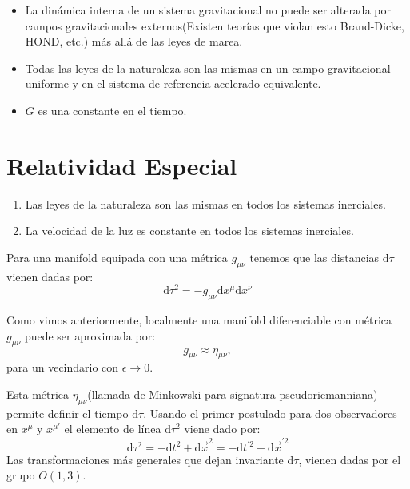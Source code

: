 \documentclass[../main]{subfiles}
\begin{document}
\begin{itemize}
    \item La dinámica interna de un sistema gravitacional no puede ser alterada por campos gravitacionales externos(Existen teorías que violan esto Brand-Dicke, HOND, etc.) más allá de las leyes de marea.
    \item Todas las leyes de la naturaleza son las mismas en un campo gravitacional uniforme y en el sistema de referencia acelerado equivalente.
    \item $G$ es una constante en el tiempo.
\end{itemize}

\section{Relatividad Especial}
\begin{enumerate}
    \item Las leyes de la naturaleza son las mismas en todos los sistemas inerciales.
    \item La velocidad de la luz es constante en todos los sistemas inerciales.
\end{enumerate}
Para una manifold equipada con una métrica $g_{\mu\nu}$ tenemos que las distancias $\mathrm{d}\tau$ vienen dadas por:
\begin{equation}
    \mathrm{d}\tau^2=-g_{\mu\nu}\mathrm{d}x^{\mu}\mathrm{d}x^{\nu}
\end{equation}

Como vimos anteriormente, localmente una manifold diferenciable con métrica $g_{\mu\nu}$ puede ser aproximada por:
\begin{equation}
    g_{\mu\nu} \approx \eta_{\mu\nu},
\end{equation}
para un vecindario con $\epsilon\rightarrow 0$.

Esta métrica $\eta_{\mu\nu}$(llamada de Minkowski para signatura pseudoriemanniana) permite definir el tiempo $\mathrm{d}\tau$. Usando el primer postulado para dos observadores en $x^{\mu}$ y $x^{\mu'}$ el elemento de línea $\mathrm{d}\tau^2$ viene dado por:
\begin{equation}
    \mathrm{d}\tau^2=-\mathrm{d}t^2+\mathrm{d}\vec{x}^2=-\mathrm{d}t^{'2}+\mathrm{d}\vec{x}^{'2}
\end{equation}
Las transformaciones más generales que dejan invariante $\mathrm{d}\tau$, vienen dadas por el grupo $O(1, 3)$.
\end{document}

